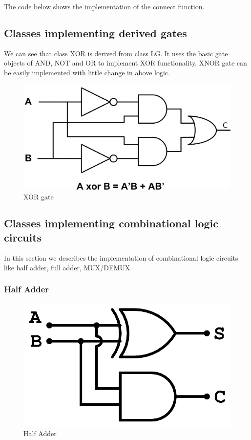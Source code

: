 \documentclass[a4paper,12pt]{article}
\begin{document}
The code below shows the implementation of the connect function.



\subsection{Classes implementing derived gates}

We can see that class XOR is derived from class LG. It uses the basic gate objects of AND, NOT and OR to implement XOR functionality. XNOR gate can be 
easily implemented with little change in above logic. 


\begin{figure}[h]
\centering
\includegraphics[scale=0.65]{XOR.png}%
\caption{XOR gate}
\end{figure} 




\subsection{Classes implementing combinational logic circuits}

In this section we describes the implementation of combinational logic circuits like half adder, full adder, MUX/DEMUX.

\subsubsection{Half Adder}

\begin{figure}[h]
\centering
\includegraphics[scale=0.3]{halfadder.png}%
\caption{Half Adder}
\end{figure} 
\end{document}
